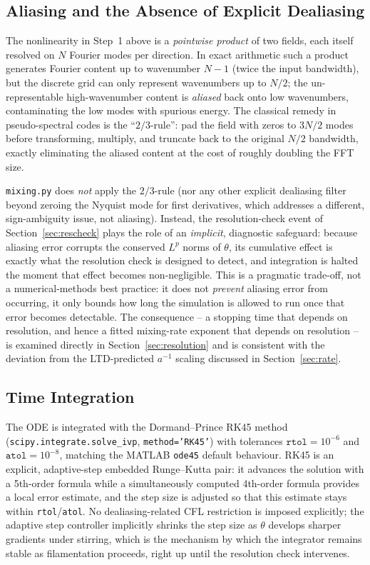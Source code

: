 \documentclass[12pt,a4paper]{article}
\theoremstyle{definition}
\theoremstyle{plain}
\begin{document}
\subsection{Aliasing and the Absence of Explicit Dealiasing}
\label{sec:aliasing}

The nonlinearity in Step~1 above is a \emph{pointwise product} of two
fields, each itself resolved on $N$ Fourier modes per direction. In exact
arithmetic such a product generates Fourier content up to wavenumber $N-1$
(twice the input bandwidth), but the discrete grid can only represent
wavenumbers up to $N/2$; the un-representable high-wavenumber content is
\emph{aliased} back onto low wavenumbers, contaminating the low modes with
spurious energy. The classical remedy in pseudo-spectral codes is the
``$2/3$-rule'': pad the field with zeros to $3N/2$ modes before
transforming, multiply, and truncate back to the original $N/2$
bandwidth, exactly eliminating the aliased content at the cost of roughly
doubling the FFT size.

\texttt{mixing.py} does \emph{not} apply the $2/3$-rule (nor any other
explicit dealiasing filter beyond zeroing the Nyquist mode for first
derivatives, which addresses a different, sign-ambiguity issue, not
aliasing). Instead, the resolution-check event of
Section~\ref{sec:rescheck} plays the role of an \emph{implicit},
diagnostic safeguard: because aliasing error corrupts the conserved $L^p$
norms of $\theta$, its cumulative effect is exactly what the resolution
check is designed to detect, and integration is halted the moment that
effect becomes non-negligible. This is a pragmatic trade-off, not a
numerical-methods best practice: it does not \emph{prevent} aliasing error
from occurring, it only bounds how long the simulation is allowed to run
once that error becomes detectable. The consequence -- a stopping time that
depends on resolution, and hence a fitted mixing-rate exponent that depends
on resolution -- is examined directly in Section~\ref{sec:resolution} and is
consistent with the deviation from the LTD-predicted $a^{-1}$ scaling
discussed in Section~\ref{sec:rate}.

\subsection{Time Integration}
\label{sec:timeint}

The ODE is integrated with the Dormand--Prince RK45 method
(\texttt{scipy.integrate.solve\_ivp}, \texttt{method='RK45'}) with tolerances
$\texttt{rtol}=10^{-6}$ and $\texttt{atol}=10^{-8}$, matching the MATLAB
\texttt{ode45} default behaviour. RK45 is an explicit, adaptive-step
embedded Runge--Kutta pair: it advances the solution with a 5th-order
formula while a simultaneously computed 4th-order formula provides a local
error estimate, and the step size is adjusted so that this estimate stays
within \texttt{rtol}/\texttt{atol}. No dealiasing-related CFL restriction is
imposed explicitly; the adaptive step controller implicitly shrinks the
step size as $\theta$ develops sharper gradients under stirring, which is
the mechanism by which the integrator remains stable as filamentation
proceeds, right up until the resolution check intervenes.
\end{document}
